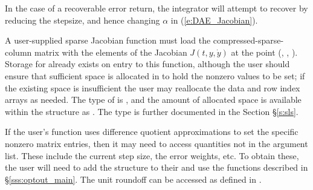 {{  In the case of a recoverable error return, 
  the integrator will attempt to recover by reducing the stepsize,
  and hence changing $\alpha$ in (\ref{e:DAE_Jacobian}).
}
{
  A user-supplied sparse Jacobian function must load the
  compressed-sparse-column matrix  with the elements of the
  Jacobian $J(t,y,\dot{y})$ at the point (, , ).
  Storage for  already exists on entry to this function,
  although the user should ensure that sufficient space is allocated
  in  to hold the nonzero values to be set; if the existing
  space is insufficient the user may reallocate the data and row index
  arrays as needed.  The type of  is , and the
  amount of allocated space is available within the 
  structure as .  The  type is further documented
  in the Section \S\ref{s:sls}. 
 
  If the user's  function uses difference quotient
  approximations to set the specific nonzero matrix entries, then it
  may need to access quantities not in the argument list. These
  include the current step size, the error weights, etc.  
  To obtain these, the user will need to add the  
  structure to their  and use the  
  functions described in
  \S\ref{sss:optout_main}. The unit roundoff can be accessed as
   defined in . 
}
}
